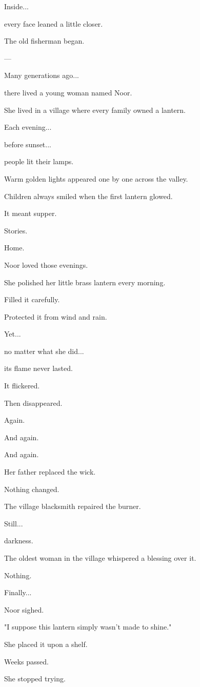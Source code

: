 \documentclass[12pt,openany]{book}
\begin{document}
Inside...

every face leaned a little closer.

The old fisherman began.

---

Many generations ago...

there lived a young woman named Noor.

She lived in a village where every family owned a lantern.

Each evening...

before sunset...

people lit their lamps.

Warm golden lights appeared one by one across the valley.

Children always smiled when the first lantern glowed.

It meant supper.

Stories.

Home.

Noor loved those evenings.

She polished her little brass lantern every morning.

Filled it carefully.

Protected it from wind and rain.

Yet...

no matter what she did...

its flame never lasted.

It flickered.

Then disappeared.

Again.

And again.

And again.

Her father replaced the wick.

Nothing changed.

The village blacksmith repaired the burner.

Still...

darkness.

The oldest woman in the village whispered a blessing over it.

Nothing.

Finally...

Noor sighed.

"I suppose this lantern simply wasn't made to shine."

She placed it upon a shelf.

Weeks passed.

She stopped trying.
\end{document}
